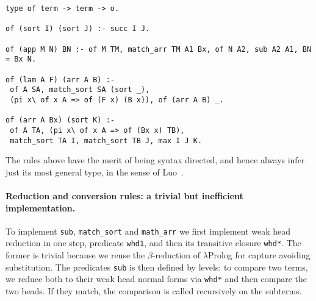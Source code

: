 \documentclass{easychair}
\begin{document}
\begin{Verbatim}
type of term -> term -> o.

of (sort I) (sort J) :- succ I J.

of (app M N) BN :- of M TM, match_arr TM A1 Bx, of N A2, sub A2 A1, BN = Bx N.

of (lam A F) (arr A B) :-
 of A SA, match_sort SA (sort _),
 (pi x\ of x A => of (F x) (B x)), of (arr A B) _.

of (arr A Bx) (sort K) :-
 of A TA, (pi x\ of x A => of (Bx x) TB),
 match_sort TA I, match_sort TB J, max I J K.
\end{Verbatim}

The rules above have the merit of being syntax directed, and hence
always infer just its most general type, in the sense of Luo~\cite{ecc}.
% 
% 
% 

\paragraph{Reduction and conversion rules: a trivial but inefficient implementation. }\label{sec:inefficient}
To implement \verb+sub+, \verb+match_sort+ and
\verb+math_arr+ we first implement weak head
reduction in one step, predicate \verb+whd1+, and then 
its transitive closure \verb+whd*+.
The former is trivial because we reuse the $\beta$-reduction of $\lambda$Prolog for capture avoiding substitution. The predicates \verb+sub+ is then defined by levels: to compare two terms, we reduce both to their weak head normal forms via \verb+whd*+ and then compare the two heads. If they match, the comparison is called recursively on the subterms.
\end{document}
